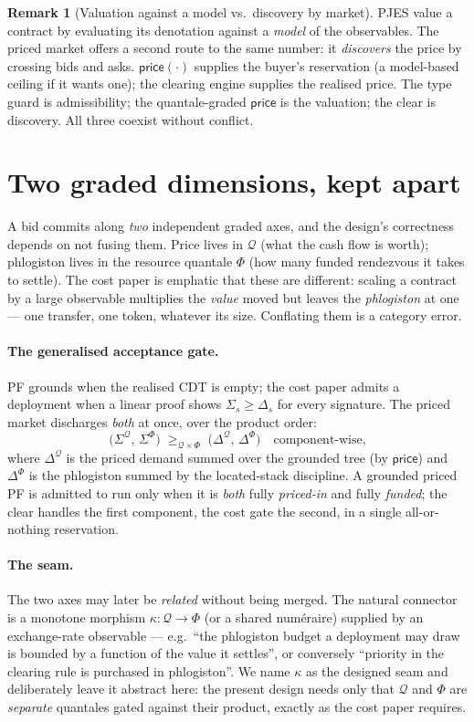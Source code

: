 \documentclass[11pt]{article}
\theoremstyle{definition}
\newtheorem{remark}{Remark}
\newcommand{\PF}{\textsf{PF}}
\newcommand{\CDT}{\textsf{CDT}}
\newcommand{\price}{\ensuremath{\mathsf{price}}}
\newcommand{\Qval}{\mathcal{Q}}            %
\newcommand{\Phl}{\Phi}                     %
\begin{document}
\begin{remark}[Valuation against a model vs.\ discovery by market]
PJES value a contract by evaluating its denotation against a \emph{model} of the observables. The
priced market offers a second route to the same number: it \emph{discovers} the price by crossing
bids and asks. $\price(\cdot)$ supplies the buyer's reservation (a model-based ceiling if it wants
one); the clearing engine supplies the realised price. The type guard is admissibility; the
quantale-graded $\price$ is the valuation; the clear is discovery. All three coexist without
conflict.
\end{remark}

\section{Two graded dimensions, kept apart}\label{sec:phlo}
A bid commits along \emph{two} independent graded axes, and the design's correctness depends on not
fusing them. Price lives in $\Qval$ (what the cash flow is worth); phlogiston lives in the resource
quantale $\Phl$ (how many funded rendezvous it takes to settle). The cost paper is emphatic that
these are different: scaling a contract by a large observable multiplies the \emph{value} moved but
leaves the \emph{phlogiston} at one --- one transfer, one token, whatever its size. Conflating them
is a category error.

\paragraph{The generalised acceptance gate.} \PF{} grounds when the realised \CDT{} is empty; the
cost paper admits a deployment when a linear proof shows $\Sigma_s \ge \Delta_s$ for every signature.
The priced market discharges \emph{both} at once, over the product order:
\[
\big(\Sigma^{\Qval},\,\Sigma^{\Phl}\big)\;\ge_{\Qval\times\Phl}\;\big(\Delta^{\Qval},\,\Delta^{\Phl}\big)
\quad\text{component-wise,}
\]
where $\Delta^{\Qval}$ is the priced demand summed over the grounded tree (by $\price$) and
$\Delta^{\Phl}$ is the phlogiston summed by the located-stack discipline. A grounded priced \PF{} is
admitted to run only when it is \emph{both} fully \emph{priced-in} and fully \emph{funded}; the
clear handles the first component, the cost gate the second, in a single all-or-nothing reservation.

\paragraph{The seam.} The two axes may later be \emph{related} without being merged. The natural
connector is a monotone morphism $\kappa:\Qval\to\Phl$ (or a shared num\'eraire) supplied by an
exchange-rate observable --- e.g.\ ``the phlogiston budget a deployment may draw is bounded by a
function of the value it settles'', or conversely ``priority in the clearing rule is purchased in
phlogiston''. We name $\kappa$ as the designed seam and deliberately leave it abstract here: the
present design needs only that $\Qval$ and $\Phl$ are \emph{separate} quantales gated against their
product, exactly as the cost paper requires.
\end{document}
